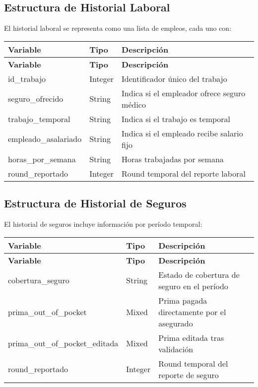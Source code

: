 \documentclass[12pt,a4paper]{article}
\begin{document}
\subsection{Estructura de Historial Laboral}
El historial laboral se representa como una lista de empleos, cada uno con:
\begin{longtable}{|p{4cm}|p{2cm}|p{8cm}|}
\hline
\textbf{Variable} & \textbf{Tipo} & \textbf{Descripción} \\
\hline
\endfirsthead
\hline
\textbf{Variable} & \textbf{Tipo} & \textbf{Descripción} \\
\hline
\endhead
id\_trabajo & Integer & Identificador único del trabajo \\
\hline
seguro\_ofrecido & String & Indica si el empleador ofrece seguro médico \\
\hline
trabajo\_temporal & String & Indica si el trabajo es temporal \\
\hline
empleado\_asalariado & String & Indica si el empleado recibe salario fijo \\
\hline
horas\_por\_semana & String & Horas trabajadas por semana \\
\hline
round\_reportado & Integer & Round temporal del reporte laboral \\
\hline
\end{longtable}

\subsection{Estructura de Historial de Seguros}
El historial de seguros incluye información por período temporal:
\begin{longtable}{|p{4cm}|p{2cm}|p{8cm}|}
\hline
\textbf{Variable} & \textbf{Tipo} & \textbf{Descripción} \\
\hline
\endfirsthead
\hline
\textbf{Variable} & \textbf{Tipo} & \textbf{Descripción} \\
\hline
\endhead
cobertura\_seguro & String & Estado de cobertura de seguro en el período \\
\hline
prima\_out\_of\_pocket & Mixed & Prima pagada directamente por el asegurado \\
\hline
prima\_out\_of\_pocket\_editada & Mixed & Prima editada tras validación \\
\hline
round\_reportado & Integer & Round temporal del reporte de seguro \\
\hline
\end{longtable}
\end{document}
